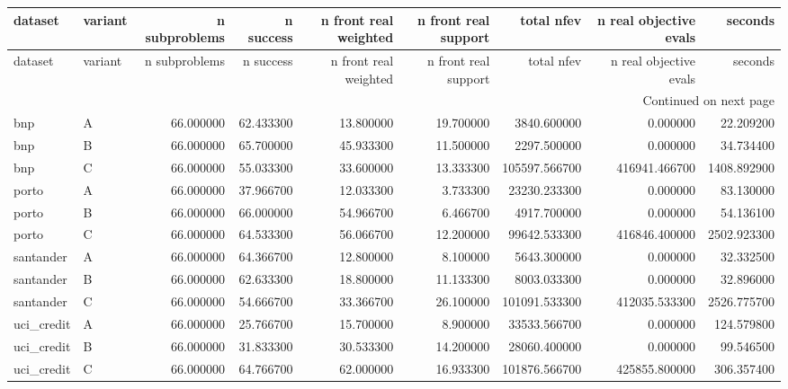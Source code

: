 \begin{landscape}
\begin{center}\label{tab:s7nbi}\end{center}
\begingroup\tiny\setlength{\tabcolsep}{2.5pt}
\begin{longtable}{llrrrrrrr}
\toprule
dataset & variant & n subproblems & n success & n front real weighted & n front real support & total nfev & n real objective evals & seconds \\
\midrule
\endfirsthead
\toprule
dataset & variant & n subproblems & n success & n front real weighted & n front real support & total nfev & n real objective evals & seconds \\
\midrule
\endhead
\midrule
\multicolumn{9}{r}{Continued on next page} \\
\midrule
\endfoot
\bottomrule
\endlastfoot
bnp & A & 66.000000 & 62.433300 & 13.800000 & 19.700000 & 3840.600000 & 0.000000 & 22.209200 \\
bnp & B & 66.000000 & 65.700000 & 45.933300 & 11.500000 & 2297.500000 & 0.000000 & 34.734400 \\
bnp & C & 66.000000 & 55.033300 & 33.600000 & 13.333300 & 105597.566700 & 416941.466700 & 1408.892900 \\
porto & A & 66.000000 & 37.966700 & 12.033300 & 3.733300 & 23230.233300 & 0.000000 & 83.130000 \\
porto & B & 66.000000 & 66.000000 & 54.966700 & 6.466700 & 4917.700000 & 0.000000 & 54.136100 \\
porto & C & 66.000000 & 64.533300 & 56.066700 & 12.200000 & 99642.533300 & 416846.400000 & 2502.923300 \\
santander & A & 66.000000 & 64.366700 & 12.800000 & 8.100000 & 5643.300000 & 0.000000 & 32.332500 \\
santander & B & 66.000000 & 62.633300 & 18.800000 & 11.133300 & 8003.033300 & 0.000000 & 32.896000 \\
santander & C & 66.000000 & 54.666700 & 33.366700 & 26.100000 & 101091.533300 & 412035.533300 & 2526.775700 \\
uci\_credit & A & 66.000000 & 25.766700 & 15.700000 & 8.900000 & 33533.566700 & 0.000000 & 124.579800 \\
uci\_credit & B & 66.000000 & 31.833300 & 30.533300 & 14.200000 & 28060.400000 & 0.000000 & 99.546500 \\
uci\_credit & C & 66.000000 & 64.766700 & 62.000000 & 16.933300 & 101876.566700 & 425855.800000 & 306.357400 \\
\end{longtable}\endgroup

\end{landscape}
